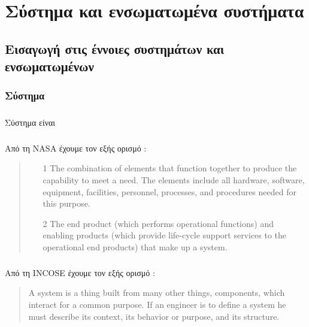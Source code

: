 \documentclass[a4paper,12pt,twoside]{report}
\begin{document}
	\chapter{Σύστημα και ενσωματωμένα συστήματα}
		\label{κεφ.:Σύστημα και ενσωματωμένα συστήματα}
	
		\section{Εισαγωγή στις έννοιες συστημάτων και ενσωματωμένων}
		
		\subsection{Σύστημα}
			\paragraph{}{Σύστημα είναι
			}
			\paragraph{}{Από τη \acrshort{NASA} έχουμε τον εξής ορισμό \cite{NASASystemsEngineeringHandbook} :
				\begin{quote}
					\begin{itemize}
						\item[1] The combination of elements that function together to produce the capability to meet a need. The elements include all hardware, software, equipment, facilities, personnel, processes, and procedures needed for this purpose.
						\item[2] The end product (which performs operational functions) and enabling products (which provide life-cycle support services to the operational end products) that make up a system.
					\end{itemize}
				\end{quote}
			}
			
			\paragraph{}{Από τη \acrshort{INCOSE} έχουμε τον εξής ορισμό \cite{EngineeringComplexSystemsWithModelsAndObjects} :
				\begin{quote}
					A system is a thing built from many other things, components, which interact for a common purpose. If an engineer is to define a system he must describe its context, its behavior or purpose, and its structure. 
				\end{quote}
			}
		
\end{document}
